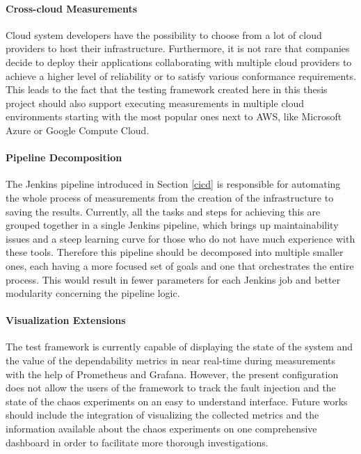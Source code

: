 \paragraph{Cross-cloud Measurements} Cloud system developers have the possibility to choose from a lot of cloud providers to host their infrastructure. Furthermore, it is not rare that companies decide to deploy their applications collaborating with multiple cloud providers to achieve a higher level of reliability or to satisfy various conformance requirements. This leads to the fact that the testing framework created here in this thesis project should also support executing measurements in multiple cloud environments starting with the most popular ones next to AWS, like Microsoft Azure or Google Compute Cloud. 

\paragraph{Pipeline Decomposition} The Jenkins pipeline introduced in Section \ref{cicd} is responsible for automating the whole process of measurements from the creation of the infrastructure to saving the results. Currently, all the tasks and steps for achieving this are grouped together in a single Jenkins pipeline, which brings up maintainability issues and a steep learning curve for those who do not have much experience with these tools. Therefore this pipeline should be decomposed into multiple smaller ones, each having a more focused set of goals and one that orchestrates the entire process. This would result in fewer parameters for each Jenkins job and better modularity concerning the pipeline logic.

\paragraph{Visualization Extensions} The test framework is currently capable of displaying the state of the system and the value of the dependability metrics in near real-time during measurements with the help of Prometheus and Grafana. However, the present configuration does not allow the users of the framework to track the fault injection and the state of the chaos experiments on an easy to understand interface. Future works should include the integration of visualizing the collected metrics and the information available about the chaos experiments on one comprehensive dashboard in order to facilitate more thorough investigations.

